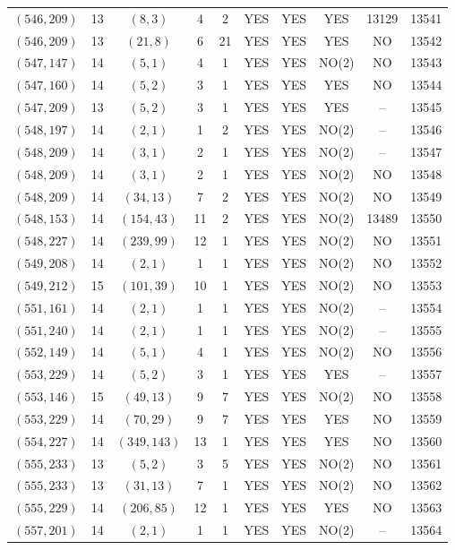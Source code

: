 \begin{longtable}{|c|c|c|c|c|c|c|c|c|c|}
$(546, 209)$ & 13 & $(8, 3)$ & 4 & 2 & YES & YES & YES & 13129 & 13541\\
$(546, 209)$ & 13 & $(21, 8)$ & 6 & 21 & YES & YES & YES & NO & 13542\\
$(547, 147)$ & 14 & $(5, 1)$ & 4 & 1 & YES & YES & NO(2) & NO & 13543\\
$(547, 160)$ & 14 & $(5, 2)$ & 3 & 1 & YES & YES & YES & NO & 13544\\
$(547, 209)$ & 13 & $(5, 2)$ & 3 & 1 & YES & YES & YES & -- & 13545\\
$(548, 197)$ & 14 & $(2, 1)$ & 1 & 2 & YES & YES & NO(2) & -- & 13546\\
$(548, 209)$ & 14 & $(3, 1)$ & 2 & 1 & YES & YES & NO(2) & -- & 13547\\
$(548, 209)$ & 14 & $(3, 1)$ & 2 & 1 & YES & YES & NO(2) & NO & 13548\\
$(548, 209)$ & 14 & $(34, 13)$ & 7 & 2 & YES & YES & NO(2) & NO & 13549\\
$(548, 153)$ & 14 & $(154, 43)$ & 11 & 2 & YES & YES & NO(2) & 13489 & 13550\\
$(548, 227)$ & 14 & $(239, 99)$ & 12 & 1 & YES & YES & NO(2) & NO & 13551\\
$(549, 208)$ & 14 & $(2, 1)$ & 1 & 1 & YES & YES & NO(2) & NO & 13552\\
$(549, 212)$ & 15 & $(101, 39)$ & 10 & 1 & YES & YES & NO(2) & NO & 13553\\
$(551, 161)$ & 14 & $(2, 1)$ & 1 & 1 & YES & YES & NO(2) & -- & 13554\\
$(551, 240)$ & 14 & $(2, 1)$ & 1 & 1 & YES & YES & NO(2) & -- & 13555\\
$(552, 149)$ & 14 & $(5, 1)$ & 4 & 1 & YES & YES & NO(2) & NO & 13556\\
$(553, 229)$ & 14 & $(5, 2)$ & 3 & 1 & YES & YES & YES & -- & 13557\\
$(553, 146)$ & 15 & $(49, 13)$ & 9 & 7 & YES & YES & NO(2) & NO & 13558\\
$(553, 229)$ & 14 & $(70, 29)$ & 9 & 7 & YES & YES & YES & NO & 13559\\
$(554, 227)$ & 14 & $(349, 143)$ & 13 & 1 & YES & YES & YES & NO & 13560\\
$(555, 233)$ & 13 & $(5, 2)$ & 3 & 5 & YES & YES & NO(2) & NO & 13561\\
$(555, 233)$ & 13 & $(31, 13)$ & 7 & 1 & YES & YES & NO(2) & NO & 13562\\
$(555, 229)$ & 14 & $(206, 85)$ & 12 & 1 & YES & YES & YES & NO & 13563\\
$(557, 201)$ & 14 & $(2, 1)$ & 1 & 1 & YES & YES & NO(2) & -- & 13564\\

\end{longtable}
